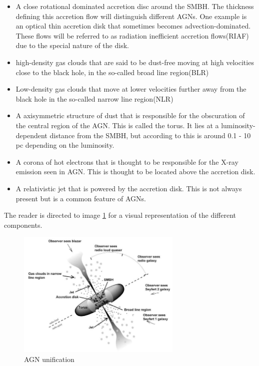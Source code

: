 \documentclass{article}
\begin{document}
\begin{itemize}
    \item A close rotational dominated accretion disc around the SMBH. The thickness defining this accretion flow will distinguish different AGNs. 
    One example is an optical thin accretion disk that sometimes becomes advection-dominated.
    These flows will be referred to as radiation inefficient accretion flows(RIAF) due to the special nature of the disk.
    \item high-density gas clouds that are said to be dust-free moving at high velocities close to the black hole, in the so-called broad line region(BLR)
    \item Low-density gas clouds that move at lower velocities further away from the black hole in the so-called narrow line region(NLR)
    \item A axisymmetric structure of dust that is responsible for the obscuration of the central region of the AGN. This is called the torus.
     It lies at a luminosity-dependent distance from the SMBH, but according to \cite{Netzer_2015} this is around 0.1 - 10 pc depending on the luminosity.
    \item A corona of hot electrons that is thought to be responsible for the X-ray emission seen in AGN. This is thought to be located above the accretion disk. 
    \item A relativistic jet that is powered by the accretion disk. This is not always present but is a common feature of AGNs.


\end{itemize}
The reader is directed to image \ref{fig:my_label} for a visual representation of the different components.


\begin{figure}
    \centering
    \includegraphics[width = 0.7\textwidth]{unified model agn.jpg}
    \caption{AGN unification}
    \label{fig:my_label}
\end{figure}
\end{document}
